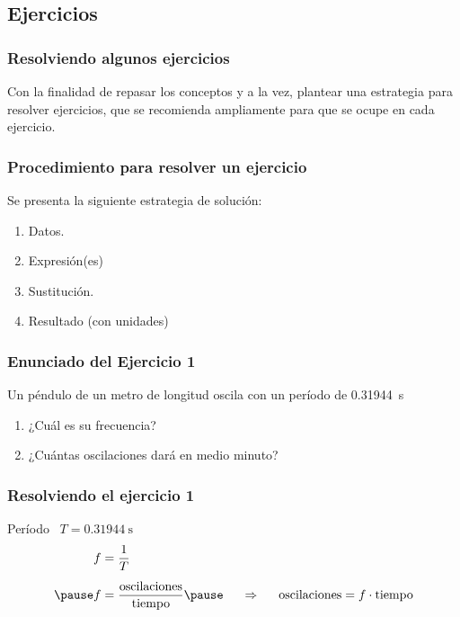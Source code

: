 \documentclass[14pt]{beamer}
\begin{document}
\subsection{Ejercicios}

\begin{frame}
\frametitle{Resolviendo algunos ejercicios}
Con la finalidad de repasar los conceptos y a la vez, plantear una estrategia para resolver ejercicios, que se recomienda ampliamente para que se ocupe en cada ejercicio.
\end{frame}
\begin{frame}
\frametitle{Procedimiento para resolver un ejercicio}
Se presenta la siguiente estrategia de solución:
\pause
{}
\begin{enumerate}[<+->]
\item Datos.
\item Expresión(es)
\item Sustitución.
\item Resultado (con unidades)
\end{enumerate}
\end{frame}    
\begin{frame}
\frametitle{Enunciado del Ejercicio 1}
Un péndulo de un metro de longitud oscila con un período de \SI{0.31944}{\second}
\\
\bigskip
\pause
{}
\begin{enumerate}[<+->]
\item ¿Cuál es su frecuencia?
\item ¿Cuántas oscilaciones dará en medio minuto?
\end{enumerate}
\end{frame}
\begin{frame}
\frametitle{Resolviendo el ejercicio 1}
 \pause Período \, $T = \SI{0.31944}{\second}$
\\
\bigskip
\pause
{}
\pause
\begin{eqnarray*}
\begin{aligned}
f &= \dfrac{1}{T} \\[0.5em] \pause
f &= \dfrac{\text{oscilaciones}}{\text{tiempo}} \pause \hspace{0.5cm} \Rightarrow \hspace{0.5cm} \text{oscilaciones} = f \cdot \text{tiempo}
\end{aligned}
\end{eqnarray*}
\end{frame}
\end{document}
